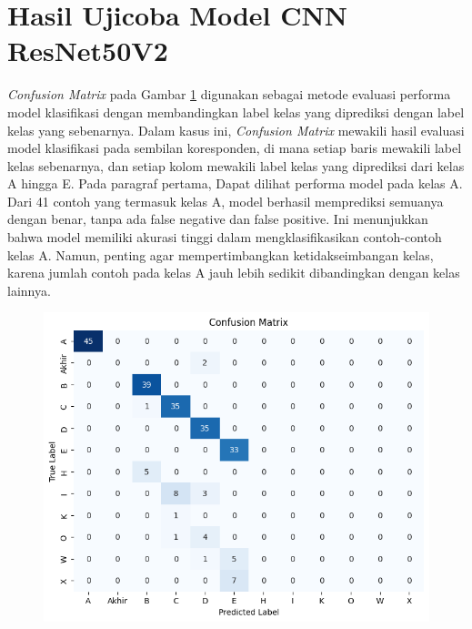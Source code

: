 \section{Hasil Ujicoba Model CNN ResNet50V2}
\textit{Confusion Matrix} pada Gambar  \ref{fig:HasilUjicobaCNNResNet50V2} digunakan sebagai metode evaluasi performa model klasifikasi dengan membandingkan label kelas yang diprediksi dengan label kelas yang sebenarnya. Dalam kasus ini, \textit{Confusion Matrix} mewakili hasil evaluasi model klasifikasi pada sembilan koresponden, di mana setiap baris mewakili label kelas sebenarnya, dan setiap kolom mewakili label kelas yang diprediksi dari kelas A hingga E. Pada paragraf pertama, Dapat dilihat performa model pada kelas A. Dari 41 contoh yang termasuk kelas A, model berhasil memprediksi semuanya dengan benar, tanpa ada false negative dan false positive. Ini menunjukkan bahwa model memiliki akurasi tinggi dalam mengklasifikasikan contoh-contoh kelas A. Namun, penting agar mempertimbangkan ketidakseimbangan kelas, karena jumlah contoh pada kelas A jauh lebih sedikit dibandingkan dengan kelas lainnya.

\begin{figure}[!hbt]
	\centering
	\includegraphics[width=0.7\linewidth]{gambar/bener/ConfusionMatrix-Ujicoba-ResNet50V2.png}
	\label{fig:HasilUjicobaCNNResNet50V2}
\end{figure}


